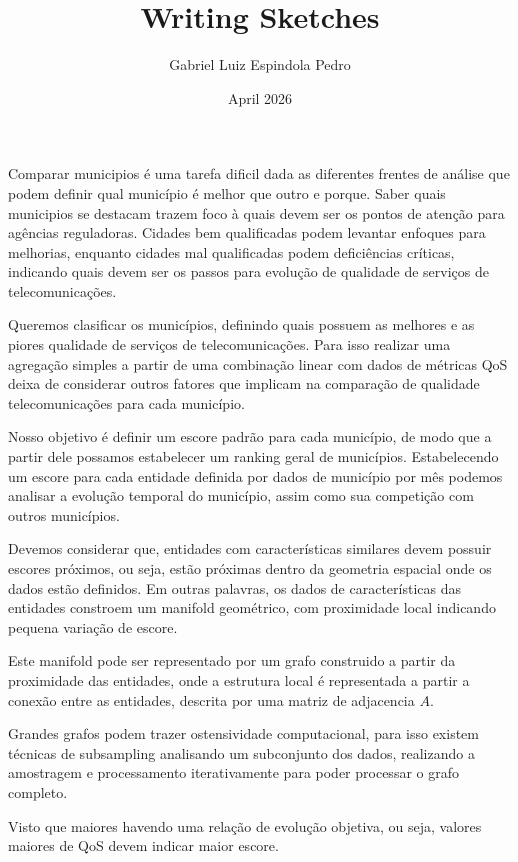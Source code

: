 \documentclass{article}
\title{Writing Sketches}
\author{Gabriel Luiz Espindola Pedro}
\date{April 2026}
\begin{document}
\maketitle

Comparar municipios é uma tarefa dificil dada as diferentes frentes de análise que podem definir qual município é melhor que outro e porque.  Saber quais municipios se destacam trazem foco à quais devem ser os pontos de atenção para agências reguladoras. Cidades bem qualificadas podem levantar enfoques para melhorias, enquanto cidades mal qualificadas podem deficiências críticas, indicando quais devem ser os passos para evolução de qualidade de serviços de telecomunicações.

Queremos clasificar os municípios, definindo quais possuem as melhores e as piores qualidade de serviços de telecomunicações. Para isso realizar uma agregação simples a partir de uma combinação linear com dados de métricas QoS deixa de considerar outros fatores que implicam na comparação de qualidade telecomunicações para cada município.

Nosso objetivo é definir um escore padrão para cada município, de modo que a partir dele possamos estabelecer um ranking geral de municípios. Estabelecendo um escore para cada entidade definida por dados de  município por mês podemos analisar a evolução temporal do município, assim como sua competição com outros municípios.


Devemos considerar que, entidades com características similares devem possuir escores próximos, ou seja, estão próximas dentro da geometria espacial onde os dados estão definidos. Em outras palavras, os dados de características das entidades constroem um manifold geométrico, com proximidade local indicando pequena variação de escore.

Este manifold pode ser representado por um grafo construido a partir da proximidade das entidades, onde a estrutura local é representada a partir a conexão entre as entidades, descrita por uma matriz de adjacencia $A$.

Grandes grafos podem trazer ostensividade computacional, para isso existem técnicas de subsampling analisando um subconjunto dos dados, realizando a amostragem e processamento iterativamente para poder processar o grafo completo.



Visto que maiores 
havendo uma relação de evolução objetiva, ou seja, valores maiores de QoS devem indicar maior escore.
\end{document}
